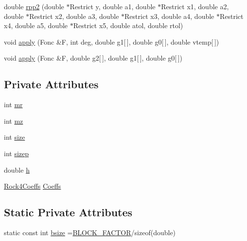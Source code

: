 \begin{DoxyCompactItemize}
double \hyperlink{classodes_1_1ToolTbb_ab8e4ba10098eba75c83ae7749762e2a6}{rpp2} (double $\ast$Restrict y, double a1, double $\ast$Restrict x1, double a2, double $\ast$Restrict x2, double a3, double $\ast$Restrict x3, double a4, double $\ast$Restrict x4, double a5, double $\ast$Restrict x5, double atol, double rtol)
\item 
void \hyperlink{classodes_1_1ToolTbb_a9f9936b923e233e7f9f7391bc00e31dd}{apply} (Fonc \&F, int deg, double g1\mbox{[}$\,$\mbox{]}, double g0\mbox{[}$\,$\mbox{]}, double vtemp\mbox{[}$\,$\mbox{]})
\item 
void \hyperlink{classodes_1_1ToolTbb_a4128d137da3c522409727039feec74ab}{apply} (Fonc \&F, double g2\mbox{[}$\,$\mbox{]}, double g1\mbox{[}$\,$\mbox{]}, double g0\mbox{[}$\,$\mbox{]})
\end{DoxyCompactItemize}
\subsection*{Private Attributes}
\begin{DoxyCompactItemize}
\item 
int \hyperlink{classodes_1_1ToolTbb_a4d0df7852c635e872bf45b71120f95ae}{mr}
\item 
int \hyperlink{classodes_1_1ToolTbb_a012568dae6afffb573423821506f0cf7}{mz}
\item 
int \hyperlink{classodes_1_1ToolTbb_a0d1270750a64754fa58e5538abb523cf}{size}
\item 
int \hyperlink{classodes_1_1ToolTbb_a4cd67d6bdcebe46c2b5b9ea79e2d8a3a}{sizep}
\item 
double \hyperlink{classodes_1_1ToolTbb_aa9b6605c14ba2b50561ed7bea5c6b8e4}{h}
\item 
\hyperlink{structodes_1_1Rock4Coeffs}{Rock4\-Coeffs} \hyperlink{classodes_1_1ToolTbb_aa4d2b275599d8eb1d8e2f9ab6cb9b3a9}{Coeffs}
\end{DoxyCompactItemize}
\subsection*{Static Private Attributes}
\begin{DoxyCompactItemize}
\item 
static const int \hyperlink{classodes_1_1ToolTbb_a27a5da88ed795805c407db7d2afc0626}{bsize} =\hyperlink{MacrosForCompilers_8hpp_aaa395acf51db19a6192e10ccd3c47fa2}{B\-L\-O\-C\-K\-\_\-\-F\-A\-C\-T\-O\-R}/sizeof(double)
\end{DoxyCompactItemize}


